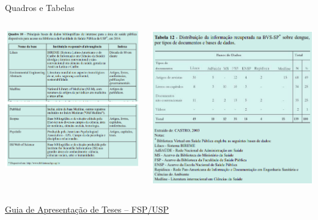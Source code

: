 \documentclass{beamer}
\begin{document}
\begin{frame}{Quadros e Tabelas}
  \begin{columns}
    \begin{column}{5cm}
      \includegraphics[width=\textwidth]{EstruturaII/obj-quadro}
    \end{column}
    \begin{column}{5cm}
      \includegraphics[width=\textwidth]{EstruturaII/obj-tabela}
    \end{column}
  \end{columns}

  \vfill
  \scriptsize
  \hfill \href{http://www.biblioteca.fsp.usp.br/~biblioteca/guia/i_cap_04.htm}
  {Guia de Apresentação de Teses -- FSP/USP}
\end{frame}
\end{document}
